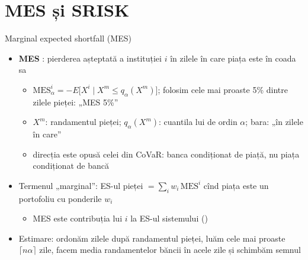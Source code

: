 \section{MES și SRISK}

\begin{frame}{Marginal expected shortfall (MES)}
\itemsize{\small}
\begin{itemize}
    \item \textbf{MES} : pierderea așteptată a instituției $i$ în zilele în care piața este în coada sa
    \begin{itemize}
        \item $\mathrm{MES}^i_\alpha = -E\big[X^i \mid X^m \le q_\alpha(X^m)\big]$; folosim cele mai proaste 5\% dintre zilele pieței: „MES 5\%”
        \item $X^m$: randamentul pieței; $q_\alpha(X^m)$: cuantila lui de ordin $\alpha$; bara: „în zilele în care”
        \item direcția este opusă celei din CoVaR: banca condiționat de piață, nu piața condiționat de bancă
    \end{itemize}
    \item Termenul „marginal”: ES-ul pieței $= \sum_i w_i\,\mathrm{MES}^i$ cînd piața este un portofoliu cu ponderile $w_i$
    \begin{itemize}
        \item MES este contribuția lui $i$ la ES-ul sistemului ()
    \end{itemize}
    \item Estimare: ordonăm zilele după randamentul pieței, luăm cele mai proaste $\lceil n\alpha \rceil$ zile, facem media randamentelor băncii în acele zile și schimbăm semnul
\end{itemize}
\end{frame}

